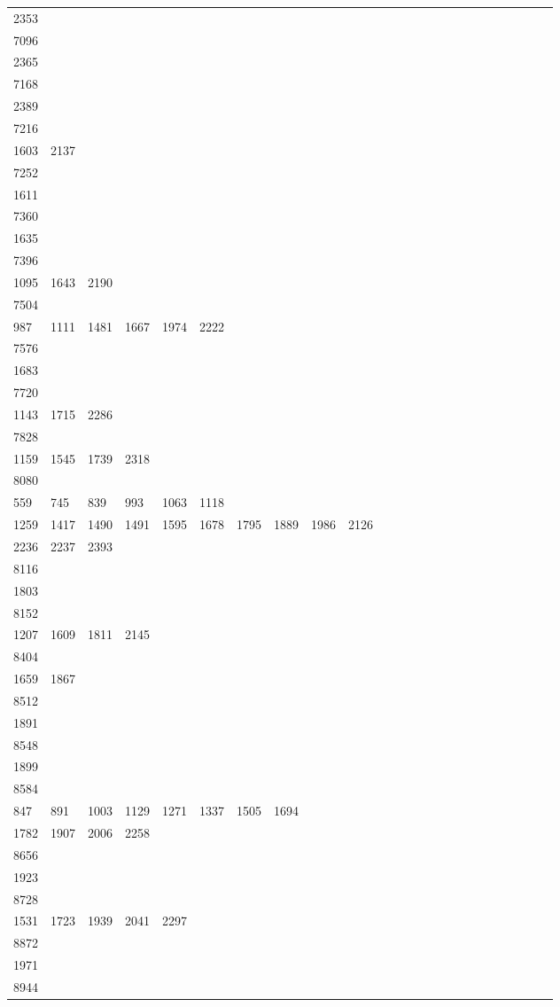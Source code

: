 \begin{longtable}{*{24}{l}}
2353& \\
7096&&&&&&&&&\\
2365& \\
7168&&&&&&&&&\\
2389& \\
7216&&&&&&&&&\\
1603& 2137& \\
7252&&&&&&&&&\\
1611& \\
7360&&&&&&&&&\\
1635& \\
7396&&&&&&&&&\\
1095& 1643& 2190\\
7504&&&&&&&&&\\
987& 1111& 1481& 1667& 1974& 2222& \\
7576&&&&&&&&&\\
1683& \\
7720&&&&&&&&&\\
1143& 1715& 2286\\
7828&&&&&&&&&\\
1159& 1545& 1739& 2318& \\
8080&&&&&&&&&\\
559& 745& 839& 993& 1063& 1118\\
1259& 1417& 1490& 1491& 1595& 1678& 1795& 1889& 1986& 2126\\
2236& 2237& 2393& \\
8116&&&&&&&&&\\
1803& \\
8152&&&&&&&&&\\
1207& 1609& 1811& 2145& \\
8404&&&&&&&&&\\
1659& 1867\\
8512&&&&&&&&&\\
1891& \\
8548&&&&&&&&&\\
1899& \\
8584&&&&&&&&&\\
847& 891& 1003& 1129& 1271& 1337& 1505& 1694\\
1782& 1907& 2006& 2258& \\
8656&&&&&&&&&\\
1923& \\
8728&&&&&&&&&\\
1531& 1723& 1939& 2041& 2297\\
8872&&&&&&&&&\\
1971& \\
8944&&&&&&&&&\\

\end{longtable}
